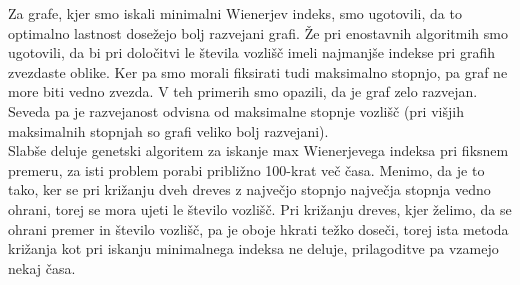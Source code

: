 \documentclass[12pt,a4paper]{amsart}
\theoremstyle{definition} %
\theoremstyle{plain} %
\begin{document}
Za grafe, kjer smo iskali minimalni Wienerjev indeks, smo ugotovili, da to optimalno lastnost dosežejo bolj razvejani grafi. Že pri enostavnih algoritmih smo ugotovili, da bi pri določitvi le števila vozlišč imeli najmanjše indekse pri grafih zvezdaste oblike. Ker pa smo morali fiksirati tudi maksimalno stopnjo, pa graf ne more biti vedno zvezda. V teh primerih smo opazili, da je graf zelo razvejan. Seveda pa je razvejanost odvisna od maksimalne stopnje vozlišč (pri višjih maksimalnih stopnjah so grafi veliko bolj razvejani).
\\
Slabše deluje genetski algoritem za iskanje max Wienerjevega indeksa pri fiksnem premeru, za isti problem porabi približno 100-krat več časa.
Menimo, da je to tako, ker se pri križanju dveh dreves z največjo stopnjo največja stopnja vedno ohrani, torej se mora ujeti le število vozlišč.
Pri križanju dreves, kjer želimo, da se ohrani premer in število vozlišč, pa je oboje hkrati težko doseči, torej ista metoda križanja kot pri
iskanju minimalnega indeksa ne deluje, prilagoditve pa vzamejo nekaj časa.
\end{document}
